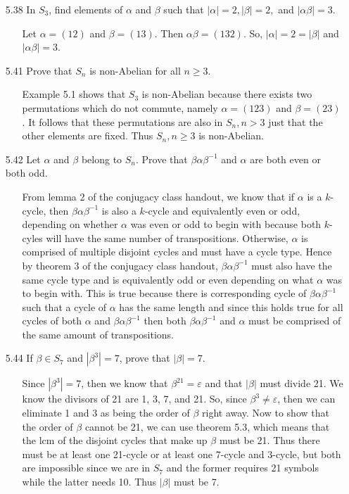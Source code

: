 \documentclass[12pt]{article}
\begin{document}
\begin{enumerate}
\item[5.38] In $S_3$, find elements of $\alpha$ and $\beta$ such that $|\alpha | = 2,
|\beta | = 2,$ and $|\alpha \beta | = 3$.
\begin{enumerate}
\item[] Let $\alpha = (12)$ and $\beta = (13)$. Then $\alpha \beta = (132)$.
So, $|\alpha| = 2 = |\beta|$ and $|\alpha \beta| = 3$.
\end{enumerate}

\item[5.41] Prove that $S_n$ is non-Abelian for all $n \geq 3$.
\begin{enumerate}
\item[] Example 5.1 shows that $S_3$ is non-Abelian because there exists two
permutations which do not commute, namely $\alpha = (123)$ and $\beta = (23)$.
It follows that these permutations are also in $S_n, n > 3$ just that the
other elements are fixed. Thus $S_n, n \geq 3$ is non-Abelian.
\end{enumerate}

\item[5.42] Let $\alpha$ and $\beta$ belong to $S_n$. Prove that $\beta \alpha \beta^{-1}$ and
$\alpha$ are both even or both odd.
\begin{enumerate}
\item[] From lemma 2 of the conjugacy class handout, we know that if $\alpha$ is a $k$-cycle, then 
$\beta\alpha\beta^{-1}$ is also a $k$-cycle and equivalently even or odd, depending on whether
$\alpha$ was even or odd to begin with because both $k$-cyles will have the same number of 
transpositions. Otherwise, $\alpha$ is comprised of multiple disjoint cycles and
must have a cycle type. Hence by theorem 3 of the conjugacy class handout, $\beta\alpha\beta^{-1}$ must
also have the same cycle type and is equivalently odd or even depending on what $\alpha$ was to begin
with. This is true because there is corresponding cycle of $\beta\alpha\beta^{-1}$ such that a cycle 
of $\alpha$ has the same length and since this holds true for all cycles of both $\alpha$ and 
$\beta\alpha\beta^{-1}$ then both $\beta\alpha\beta^{-1}$ and $\alpha$ must be comprised of
the same amount of transpositions.
\end{enumerate}

\item[5.44] If $\beta \in S_7$ and $|\beta^3| = 7$, prove that $|\beta | = 7$.
\begin{enumerate}
\item[] Since $|\beta^3| = 7$, then we know that
$\beta^{21} = \varepsilon$ and that $|\beta|$ must divide 21. We know
the divisors of 21 are 1, 3, 7, and 21. So, since
$\beta^3 \neq \varepsilon$, then we can eliminate 1 and 3 as being the
order of $\beta$ right away. Now to show that the order of $\beta$ cannot be 21,
we can use theorem 5.3, which means that the lcm of the disjoint cycles that
make up $\beta$ must be 21. Thus there must be at least one 21-cycle or at least
one 7-cycle and 3-cycle, but both are impossible since we are in $S_7$ and the
former requires 21 symbols while the latter needs 10. Thus $|\beta|$ must be 7. 
\end{enumerate}


\end{enumerate}
\end{document}
